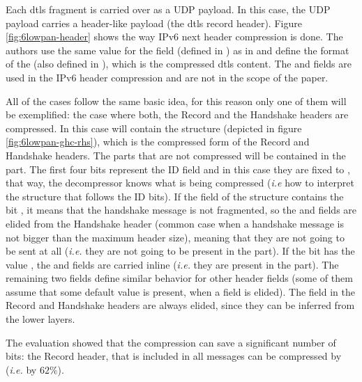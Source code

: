 \documentclass{llncs}
\begin{document}
Each \gls{dtls} fragment is carried over as a UDP payload. In this case,
the UDP payload carries a header-like payload (the \gls{dtls} record header).
Figure \ref{fig:6lowpan-header} shows the way IPv6 next header compression is done.
The authors use the same value for the  field (defined in \cite{RFC6282})
as in  and define the format of the 
(also defined in \cite{RFC6282}), which is the compressed \gls{dtls} content. The 
and  fields are used in the IPv6 header compression
and are not in the scope of the paper.

All of the cases follow the same basic idea, for this reason only one of them will be exemplified:
the case where both, the Record and the Handshake headers are compressed.
In this case  will contain the 
structure (depicted in figure \ref{fig:6lowpan-ghc-rhs}), which is the compressed form of the Record and Handshake headers. The
parts that are not compressed will be contained in the  part.
The first four bits represent the ID field and in this case they are fixed to ,
that way, the decompressor knows what is being compressed (\textit{i.e} how to interpret
the structure that follows the ID bits). If the  field of the  structure contains the
bit , it means that the handshake message is not fragmented, so
the  and  fields are
elided from the Handshake header (common case when a handshake message is not bigger than
the maximum header size), meaning that they are not going to be sent at
all (\textit{i.e.} they are not going to be present in the  part).
If the  bit has the value , the 
and  fields are carried inline (\textit{i.e.} they are
present in the  part). The remaining two fields define similar
behavior for other header fields (some of them assume that some default value is present, when a field is elided).
The  field in the Record and Handshake headers are always elided,
since they can be inferred from the lower layers.

The evaluation showed that the compression can save a significant number of bits:
the Record header, that is included in all messages can be compressed by 
(\textit{i.e.} by $62\%$).
\end{document}
